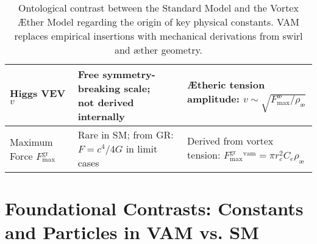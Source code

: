 \begin{table}[H]
\begin{tabular}{|l|l|l|}
        \makecell[l]{Higgs VEV \\ $v$} &
        \makecell[l]{Free symmetry-breaking scale; \\ not derived internally} &
        \makecell[l]{Ætheric tension amplitude: \\ $v \sim \sqrt{F^{\text{\ae}}_{\text{max}}/\rho_\text{\ae}}$} \\
        \hline

        \makecell[l]{Maximum \\ Force $F^{\text{gr}}_{\text{max}}$} &
        \makecell[l]{Rare in SM; from GR: \\ $F = c^4/4G$ in limit cases} &
        \makecell[l]{Derived from vortex tension: \\ $F^{\text{gr}}_{\text{max}}^{\text{vam}} = \pi r_c^2 C_e \rho_\text{\ae}$} \\
        \hline
    \end{tabular}
    \caption{Ontological contrast between the Standard Model and the Vortex Æther Model regarding the origin of key physical constants. VAM replaces empirical insertions with mechanical derivations from swirl and æther geometry.}
    \label{tab:SM_vs_VAM_constants}
\end{table}

\section*{Foundational Contrasts: Constants and Particles in VAM vs. SM}

